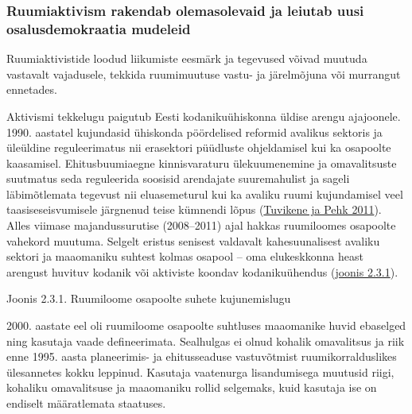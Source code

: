 \documentclass[estonian,]{article}
\begin{document}
\hypertarget{ruumiaktivism-rakendab-olemasolevaid-ja-leiutab-uusi-osalusdemokraatia-mudeleid}{%
\subsubsection*{Ruumiaktivism rakendab olemasolevaid ja leiutab uusi osalusdemokraatia mudeleid}\label{ruumiaktivism-rakendab-olemasolevaid-ja-leiutab-uusi-osalusdemokraatia-mudeleid}}

\begin{blockquote-right}
Ruumiaktivistide loodud liikumiste eesmärk ja tegevused võivad muutuda
vastavalt vajadusele, tekkida ruumimuutuse vastu- ja järelmõjuna või
murrangut ennetades.
\end{blockquote-right}

Aktivismi tekkelugu paigutub Eesti kodanikuühiskonna üldise arengu ajajoonele. 1990. aastatel kujundasid ühiskonda pöördelised reformid avalikus sektoris ja üleüldine reguleerimatus nii erasektori püüdluste ohjeldamisel kui ka osapoolte kaasamisel. Ehitusbuumiaegne kinnisvaraturu ülekuumenemine ja omavalitsuste suutmatus seda reguleerida soosisid arendajate suuremahulist ja sageli läbimõtlemata tegevust nii eluasemeturul kui ka avaliku ruumi kujundamisel veel taasiseseisvumisele järgnenud teise kümnendi lõpus (\protect\hyperlink{Tuvikene2011}{Tuvikene ja Pehk 2011}). Alles viimase majandussurutise (2008--2011) ajal hakkas ruumiloomes osapoolte vahekord muutuma. Selgelt eristus senisest valdavalt kahesuunalisest avaliku sektori ja maaomaniku suhtest kolmas osapool -- oma elukeskkonna heast arengust huvituv kodanik või aktiviste koondav kodanikuühendus (\protect\hyperlink{figure231}{joonis 2.3.1}).

{Joonis 2.3.1.} Ruumiloome osapoolte suhete kujunemislugu

2000. aastate eel oli ruumiloome osapoolte suhtluses maaomanike huvid ebaselged ning kasutaja vaade defineerimata. Sealhulgas ei olnud kohalik omavalitsus ja riik enne 1995. aasta planeerimis- ja ehitusseaduse vastuvõtmist ruumikorralduslikes ülesannetes kokku leppinud. Kasutaja vaatenurga lisandumisega muutusid riigi, kohaliku omavalitsuse ja maaomaniku rollid selgemaks, kuid kasutaja ise on endiselt määratlemata staatuses.
\end{document}
